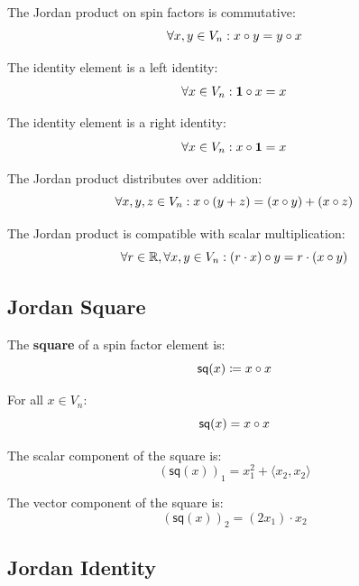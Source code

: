 \begin{theorem}
The Jordan product on spin factors is commutative:
\[ \forall x, y \in V_n : x \circ y = y \circ x \]
\end{theorem}

\begin{theorem}
The identity element is a left identity:
\[ \forall x \in V_n : \mathbf{1} \circ x = x \]
\end{theorem}

\begin{theorem}
The identity element is a right identity:
\[ \forall x \in V_n : x \circ \mathbf{1} = x \]
\end{theorem}

\begin{theorem}
The Jordan product distributes over addition:
\[ \forall x, y, z \in V_n : x \circ (y + z) = (x \circ y) + (x \circ z) \]
\end{theorem}

\begin{theorem}
The Jordan product is compatible with scalar multiplication:
\[ \forall r \in \mathbb{R}, \forall x, y \in V_n : (r \cdot x) \circ y = r \cdot (x \circ y) \]
\end{theorem}

\subsection{Jordan Square}

\begin{definition}[sq]
The \textbf{square} of a spin factor element is:
\[ \mathsf{sq}(x) \coloneqq x \circ x \]
\end{definition}

\begin{lemma}[sq\_def]
For all $x \in V_n$:
\[ \mathsf{sq}(x) = x \circ x \]
\end{lemma}

\begin{theorem}[sq\_scalar]
The scalar component of the square is:
\[ (\mathsf{sq}(x))_1 = x_1^2 + \langle x_2, x_2 \rangle \]
\end{theorem}

\begin{theorem}[sq\_vector]
The vector component of the square is:
\[ (\mathsf{sq}(x))_2 = (2 x_1) \cdot x_2 \]
\end{theorem}

\subsection{Jordan Identity}

